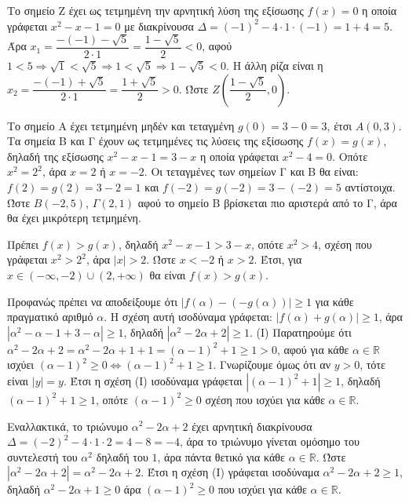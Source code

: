 
\begin{alist}
\item Το σημείο Ζ έχει ως τετμημένη την αρνητική λύση της εξίσωσης $f(x) = 0$ η οποία γράφεται $x^2 - x - 1 = 0$ με διακρίνουσα $\Delta = (-1)^2 - 4 \cdot 1 \cdot (-1) = 1 + 4 = 5$.
Άρα $x_1 = \dfrac{-(-1)-\sqrt{5}}{2 \cdot 1} = \dfrac{1-\sqrt{5}}{2} < 0$, αφού $1 < 5 \Rightarrow \sqrt{1} < \sqrt{5} \Rightarrow 1 < \sqrt{5} \Rightarrow 1 - \sqrt{5} < 0$.
Η άλλη ρίζα είναι η $x_2 = \dfrac{-(-1)+\sqrt{5}}{2 \cdot 1} = \dfrac{1+\sqrt{5}}{2} > 0$. Ώστε $Z\left(\dfrac{1-\sqrt{5}}{2} , 0\right)$.

Το σημείο Α έχει τετμημένη μηδέν και τεταγμένη $g(0) = 3 - 0 = 3$, έτσι $A(0, 3)$.
Τα σημεία Β και Γ έχουν ως τετμημένες τις λύσεις της εξίσωσης $f(x) = g(x)$, δηλαδή της εξίσωσης $x^2 - x - 1 = 3 - x$ η οποία γράφεται $x^2 - 4 = 0$. Οπότε $x^2 = 2^2$, άρα $x = 2$ ή $x = -2$.
Οι τεταγμένες των σημείων Γ και Β θα είναι:
$f(2) = g(2) = 3 - 2 = 1$ και $f(-2) = g(-2) = 3 - (-2) = 5$ αντίστοιχα.
Ώστε $B(-2, 5)$, $\Gamma(2, 1)$ αφού το σημείο Β βρίσκεται πιο αριστερά από το Γ, άρα θα έχει μικρότερη τετμημένη.

\item Πρέπει $f(x) > g(x)$, δηλαδή $x^2 - x - 1 > 3 - x$, οπότε $x^2 > 4$, σχέση που γράφεται $x^2 > 2^2$, άρα $|x| > 2$. Ώστε $x < -2$ ή $x > 2$.
Έτσι, για $x \in (-\infty , -2) \cup (2 , +\infty)$ θα είναι $f(x) > g(x)$.

\item Προφανώς πρέπει να αποδείξουμε ότι $|f(\alpha) - (- g(\alpha))| \ge 1$ για κάθε πραγματικό αριθμό $\alpha$. Η σχέση αυτή ισοδύναμα γράφεται:
$|f(\alpha) + g(\alpha)| \ge 1$, άρα $|\alpha^2 - \alpha - 1 + 3 - \alpha| \ge 1$, δηλαδή $|\alpha^2 - 2\alpha + 2| \ge 1$. (Ι)
Παρατηρούμε ότι $\alpha^2 - 2\alpha + 2 = \alpha^2 - 2\alpha + 1 + 1 = (\alpha - 1)^2 + 1 \ge 1 > 0$, αφού για κάθε $\alpha \in \mathbb{R}$ ισχύει $(\alpha - 1)^2 \ge 0 \Leftrightarrow (\alpha - 1)^2 + 1 \ge 1$.
Γνωρίζουμε όμως ότι αν $y > 0$, τότε είναι $|y| = y$.
Έτσι η σχέση (Ι) ισοδύναμα γράφεται $|(\alpha - 1)^2 + 1| \ge 1$, δηλαδή $(\alpha - 1)^2 + 1 \ge 1$, οπότε $(\alpha - 1)^2 \ge 0$ σχέση που ισχύει για κάθε $\alpha \in \mathbb{R}$.

Εναλλακτικά, το τριώνυμο $\alpha^2 - 2\alpha + 2$ έχει αρνητική διακρίνουσα $\Delta = (-2)^2 - 4 \cdot 1 \cdot 2 = 4 - 8 = -4$, άρα το τριώνυμο γίνεται ομόσημο του συντελεστή του $\alpha^2$ δηλαδή του $1$, άρα πάντα θετικό για κάθε $\alpha \in \mathbb{R}$. Ώστε $|\alpha^2 - 2\alpha + 2| = \alpha^2 - 2\alpha + 2$. Έτσι η σχέση (Ι) γράφεται ισοδύναμα $\alpha^2 - 2\alpha + 2 \ge 1$, δηλαδή $\alpha^2 - 2\alpha + 1 \ge 0$ άρα $(\alpha - 1)^2 \ge 0$ που ισχύει για κάθε $\alpha \in \mathbb{R}$.
\end{alist}

